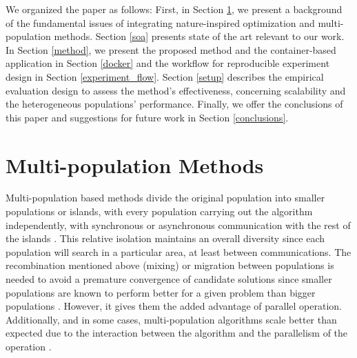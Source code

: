\documentclass[review]{elsarticle}
\begin{document}
We organized the paper as follows: First, in Section \ref{multi}, we present a
background of the fundamental issues of integrating nature-inspired optimization
and multi-population methods. Section \ref{soa} presents state of the art relevant to
our work. In Section \ref{method}, we present the proposed method and the container-based
application in Section \ref{docker} and the workflow for reproducible experiment design in Section \ref{experiment_flow}. %
Section \ref{setup} describes the empirical evaluation design to assess the 
method's effectiveness, concerning scalability and %
the heterogeneous populations' performance.  %
Finally, we offer the conclusions of this paper and suggestions for future work in 
Section \ref{conclusions}.


\section{Multi-population Methods} %
\label{multi}

Multi-population based methods divide the original population into
smaller populations or islands, with every population carrying out the
algorithm independently, with synchronous or asynchronous communication with the
rest of the islands \cite{Ma2019}.%
This relative isolation maintains an overall
diversity since each population will search in a particular area, at least
between communications. The recombination mentioned above (mixing) or migration
between populations is needed to avoid a premature convergence of candidate
solutions since smaller populations are known to perform better for a given
problem than bigger populations \cite{li2016multi,wu2016differential}. %
However, it gives them the added advantage of
parallel operation. Additionally, and in some cases, multi-population algorithms
scale better than expected due to the interaction between the algorithm and the
parallelism of the operation \cite{ALBA20027}. %
\end{document}
